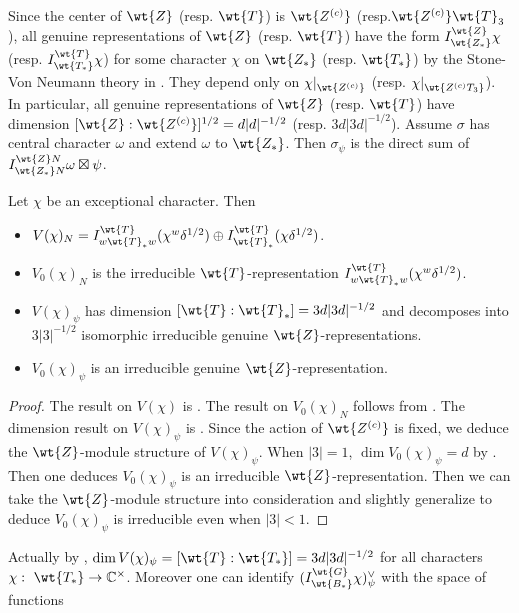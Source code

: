 \documentclass[11pt,reqno]{amsart}
\newcommand{\BC}{{\mathbb {C}}} \newcommand{\BD}{{\mathbb {D}}}
\theoremstyle{plain}
\theoremstyle{remark} \newtheorem{remark}[thm]{Remark}
\theoremstyle{definition} \newtheorem{exercise}[thm]{Exercise}
\theoremstyle{definition} \newtheorem{example}[thm]{Example} \newtheorem{condition}[thm]{Condition}
\numberwithin{equation}{section}
\renewcommand{\-}{\text{--}}
\begin{document}
 Since the center of $\wt{Z}$ (resp. $\wt{T}$) is $\wt{Z^{(c)}}$ (resp.$\wt{Z^{(c)}}\wt{T}_3$), all genuine representations of $\wt{Z}$ (resp. $\wt{T}$) have the form  $I_{\wt{Z_*}}^{\wt{Z}}\chi$ (resp. $I_{\wt{T_*}}^{\wt{T}}\chi$) for some character $\chi$ on $\wt{Z_*}$ (resp. $\wt{T_*}$) by the Stone-Von Neumann theory in \cite[Section 0.3]{KP84}. They depend only on $\chi|_{\wt{Z^{(c)}}}$ (resp. $\chi|_{\wt{Z^{(c)}T_3}}$). In particular, all 
 genuine representations of $\wt{Z}$ (resp. $\wt{T}$)  have dimension $[\wt{Z}:\wt{Z^{(c)}}]^{1/2}=d|d|^{-1/2}$ (resp. $3d|3d|^{-1/2}$).
  Assume $\sigma$ has central character $\omega$ and extend $\omega$ to $\wt{Z_*}$. Then $\sigma_\psi$ is the direct sum of $I_{\wt{Z_*}N}^{\wt{Z}N}\omega\boxtimes\psi$.
\begin{prop}\label{Jac}Let $\chi$ be an exceptional character. Then
\begin{itemize}
\item $V(\chi)_N=I_{w\wt{T}_*w}^{\wt{T}}(\chi^w\delta^{1/2})\oplus I_{\wt{T}_*}^{\wt{T}}(\chi\delta^{1/2})$.
\item $V_0(\chi)_N$ is the irreducible $\wt{T}$-representation $I_{w\wt{T}_*w}^{\wt{T}}(\chi^w\delta^{1/2})$. 
\item $V(\chi)_\psi$ has dimension $[\wt{T}: \wt{T}_*]=3d|3d|^{-1/2}$ and decomposes into $3|3|^{-1/2}$ isomorphic irreducible genuine $\wt{Z}$-representations.
\item   $V_0(\chi)_\psi$ is an irreducible genuine $\wt{Z}$-representation.
\end{itemize}
\end{prop}
\begin{proof}The result on $V(\chi)$ is \cite[Lemma I.2.1]{KP84}. The result on $V_0(\chi)_N$ follows from \cite[Theorem I.2.9(e)]{KP84}. The dimension result on $V(\chi)_\psi$ is \cite[Lemma I.3.2]{KP84}. Since the action of $\wt{Z^{(c)}}$ is fixed, we  deduce the $\wt{Z}$-module structure of $V(\chi)_\psi$.  When $|3|=1$,  $\dim V_0(\chi)_\psi=d$ by \cite[Theorem I.3.5]{KP84}.  Then one deduces $V_0(\chi)_\psi$ is an irreducible $\wt{Z}$-representation. Then we can take the $\wt{Z}$-module structure into consideration and slightly generalize \cite[Theorem II.5(b)]{KP84} to deduce $V_0(\chi)_\psi$ is irreducible even when $|3|<1$.
\end{proof}
Actually by \cite[Lemma I.3.2]{KP84}, $\dim V(\chi)_\psi=[\wt{T}: \wt{T_*}]=3d|3d|^{-1/2}$  for all characters $\chi:\ \wt{T_*}\to\BC^\times$. Moreover one can identify   $(I_{\wt{B_*}}^{\wt{G}}\chi)_{\psi}^\vee$ with the space of functions 
\end{document}
